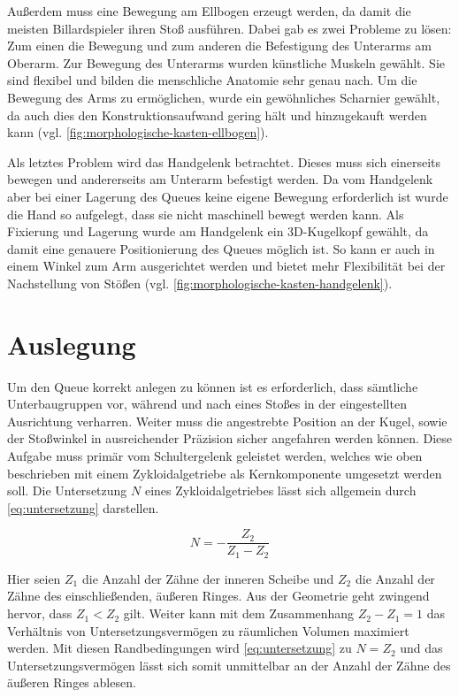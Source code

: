 		Außerdem muss eine Bewegung am Ellbogen erzeugt werden, da damit die meisten Billardspieler ihren Stoß ausführen. Dabei gab es zwei Probleme zu lösen: Zum einen die Bewegung und zum anderen die Befestigung des Unterarms am Oberarm. Zur Bewegung des Unterarms wurden künstliche Muskeln gewählt. Sie sind flexibel und bilden die menschliche Anatomie sehr genau nach. Um die Bewegung des Arms zu ermöglichen, wurde ein gewöhnliches Scharnier gewählt, da auch dies den Konstruktionsaufwand gering hält und hinzugekauft werden kann (vgl. \cref{fig:morphologische-kasten-ellbogen}).\par\medskip

		Als letztes Problem wird das Handgelenk betrachtet. Dieses muss sich einerseits bewegen und andererseits am Unterarm befestigt werden. Da vom Handgelenk aber bei einer Lagerung des Queues keine eigene Bewegung erforderlich ist wurde die Hand so aufgelegt, dass sie nicht maschinell bewegt werden kann. Als Fixierung und Lagerung wurde am Handgelenk ein 3D-Kugelkopf gewählt, da damit eine genauere Positionierung des Queues möglich ist. So kann er auch in einem Winkel zum Arm ausgerichtet werden und bietet mehr Flexibilität bei der Nachstellung von Stößen (vgl. \cref{fig:morphologische-kasten-handgelenk}).
	\section{Auslegung}\label{sec:auslegung}
		Um den Queue korrekt anlegen zu können ist es erforderlich, dass sämtliche Unterbaugruppen vor, während und nach eines Stoßes in der eingestellten Ausrichtung verharren.
		Weiter muss die angestrebte Position an der Kugel, sowie der Stoßwinkel in ausreichender Präzision sicher angefahren werden können.
		Diese Aufgabe muss primär vom Schultergelenk geleistet werden, welches wie oben beschrieben mit einem Zykloidalgetriebe als Kernkomponente umgesetzt werden soll.
		Die Untersetzung \(N\) eines Zykloidalgetriebes lässt sich allgemein durch \cref{eq:untersetzung} darstellen.

		\begin{equation}
			N = -\frac{Z_2}{Z_1 - Z_2}%
			\label{eq:untersetzung}
		\end{equation}

		Hier seien \(Z_1\) die Anzahl der Zähne der inneren Scheibe und \(Z_2\) die Anzahl der Zähne des einschließenden, äußeren Ringes.
		Aus der Geometrie geht zwingend hervor, dass \(Z_1 < Z_2\) gilt.
		Weiter kann mit dem Zusammenhang \(Z_2 - Z_1 = 1\) das Verhältnis von Untersetzungsvermögen zu räumlichen Volumen maximiert werden.
		Mit diesen Randbedingungen wird \cref{eq:untersetzung} zu \(N = Z_2\) und das Untersetzungsvermögen lässt sich somit unmittelbar an der Anzahl der Zähne des äußeren Ringes ablesen.

